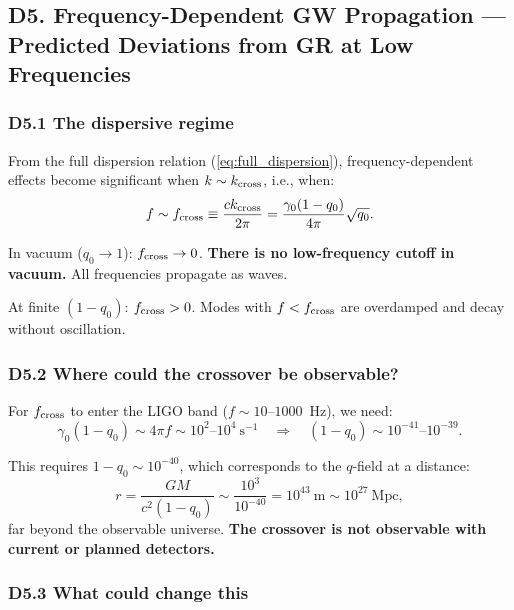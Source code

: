 \documentclass[reprint]{revtex4-2}
\begin{document}
\subsection{D5. Frequency-Dependent GW Propagation --- Predicted Deviations from GR at Low Frequencies}

\subsubsection{D5.1 The dispersive regime}

From the full dispersion relation (\ref{eq:full_dispersion}), frequency-dependent effects become significant when $k \sim k_{\rm cross}$, i.e., when:
\begin{equation}
f \sim f_{\rm cross} \equiv \frac{c k_{\rm cross}}{2\pi} = \frac{\gamma_0(1-q_0)}{4\pi}\sqrt{q_0}.
\end{equation}

In vacuum ($q_0 \to 1$): $f_{\rm cross} \to 0$. \textbf{There is no low-frequency cutoff in vacuum.} All frequencies propagate as waves.

At finite $(1-q_0)$: $f_{\rm cross} > 0$. Modes with $f < f_{\rm cross}$ are overdamped and decay without oscillation.

\subsubsection{D5.2 Where could the crossover be observable?}

For $f_{\rm cross}$ to enter the LIGO band ($f \sim 10$--$1000$~Hz), we need:
\begin{equation}
\gamma_0(1-q_0) \sim 4\pi f \sim 10^2\text{--}10^4~\text{s}^{-1} \quad\Longrightarrow\quad (1-q_0) \sim 10^{-41}\text{--}10^{-39}.
\end{equation}

This requires $1-q_0 \sim 10^{-40}$, which corresponds to the $q$-field at a distance:
\begin{equation}
r = \frac{GM}{c^2(1-q_0)} \sim \frac{10^3}{10^{-40}} = 10^{43}~\text{m} \sim 10^{27}~\text{Mpc},
\end{equation}
far beyond the observable universe. \textbf{The crossover is not observable with current or planned detectors.}

\subsubsection{D5.3 What could change this}
\end{document}

